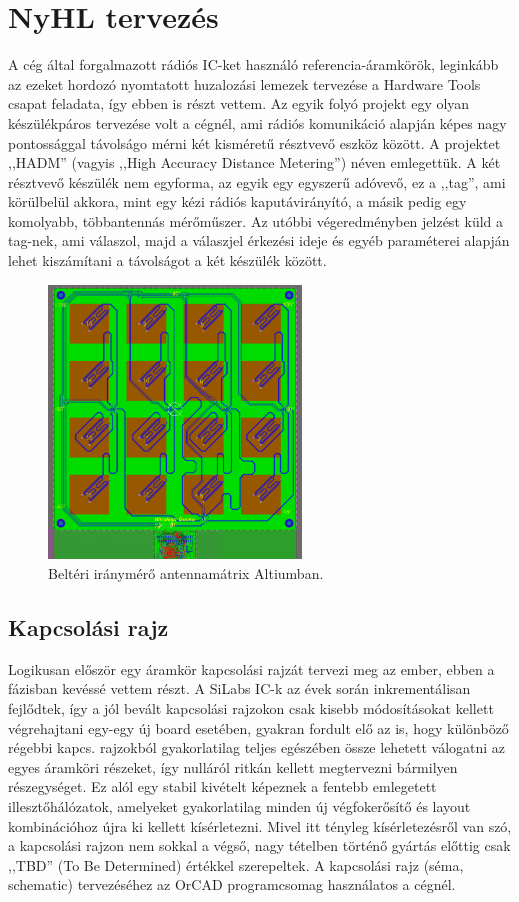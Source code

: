     \section{NyHL tervezés}
        A cég által forgalmazott rádiós IC-ket használó referencia-áramkörök, leginkább az ezeket hordozó nyomtatott huzalozási lemezek tervezése a Hardware Tools csapat feladata, így ebben is részt vettem. Az egyik folyó projekt egy olyan készülékpáros tervezése volt a cégnél, ami rádiós komunikáció alapján képes nagy pontossággal távolságo mérni két kisméretű résztvevő eszköz között. A projektet ,,HADM'' (vagyis ,,High Accuracy Distance Metering'') néven emlegettük. A két résztvevő készülék nem egyforma, az egyik egy egyszerű adóvevő, ez a ,,tag'', ami körülbelül akkora, mint egy kézi rádiós kaputávirányító, a másik pedig egy komolyabb, többantennás mérőműszer. Az utóbbi végeredményben jelzést küld a tag-nek, ami válaszol, majd a válaszjel érkezési ideje és egyéb paraméterei alapján lehet kiszámítani a távolságot a két készülék között.
            \begin{figure}
                \centering
                \includegraphics[width=0.6\textwidth]{kep/szerkesztett/antennamatrix.png}
                \caption{Beltéri iránymérő antennamátrix Altiumban.}
                \label{fig:antennamatrix}
            \end{figure}
%
        \subsection{Kapcsolási rajz}
            Logikusan először egy áramkör kapcsolási rajzát tervezi meg az ember, ebben a fázisban kevéssé vettem részt. A SiLabs IC-k az évek során inkrementálisan fejlődtek, így a jól bevált kapcsolási rajzokon csak kisebb módosításokat kellett végrehajtani egy-egy új board esetében, gyakran fordult elő az is, hogy különböző régebbi kapcs. rajzokból gyakorlatilag teljes egészében össze lehetett válogatni az egyes áramköri részeket, így nulláról ritkán kellett megtervezni bármilyen részegységet. Ez alól egy stabil kivételt képeznek a fentebb emlegetett illesztőhálózatok, amelyeket gyakorlatilag minden új végfokerősítő és layout kombinációhoz újra ki kellett kísérletezni. Mivel itt tényleg kísérletezésről van szó, a kapcsolási rajzon nem sokkal a végső, nagy tételben történő gyártás előttig csak ,,TBD'' (To Be Determined) értékkel szerepeltek. A kapcsolási rajz (séma, schematic) tervezéséhez az OrCAD \cite{OrCAD} programcsomag használatos a cégnél.
